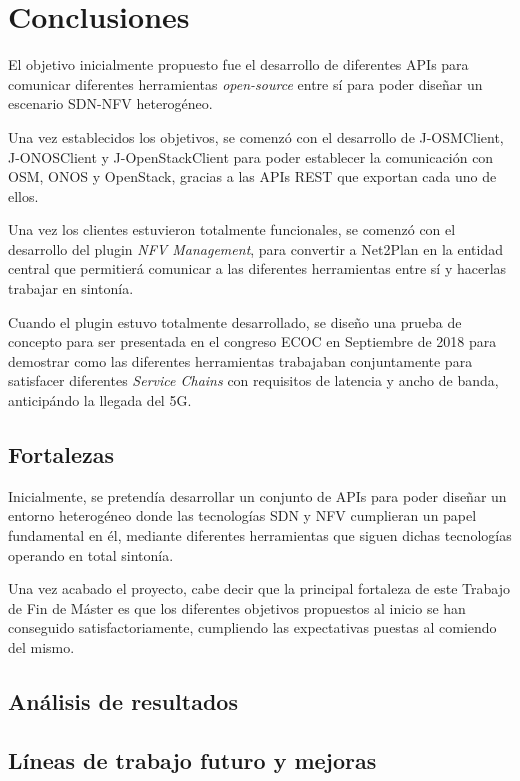 \chapter{Conclusiones}
\label{conclusiones}

El objetivo inicialmente propuesto fue el desarrollo de diferentes \acp{API} para comunicar diferentes herramientas \textit{open-source} entre sí para poder diseñar un escenario \ac{SDN}-\ac{NFV} heterogéneo.

Una vez establecidos los objetivos, se comenzó con el desarrollo de J-OSMClient, J-ONOSClient y J-OpenStackClient para poder establecer la comunicación con \ac{OSM}, \ac{ONOS} y OpenStack, gracias a las \acp{API} \ac{REST} que exportan cada uno de ellos.

Una vez los clientes estuvieron totalmente funcionales, se comenzó con el desarrollo del plugin \textit{NFV Management}, para convertir a Net2Plan en la entidad central que permitierá comunicar a las diferentes herramientas entre sí y hacerlas trabajar en sintonía.

Cuando el plugin estuvo totalmente desarrollado, se diseño una prueba de concepto para ser presentada en el congreso \ac{ECOC} en Septiembre de 2018 para demostrar como las diferentes herramientas trabajaban conjuntamente para satisfacer diferentes \textit{Service Chains} con requisitos de latencia y ancho de banda, anticipándo la llegada del 5G.


\section{Fortalezas}

Inicialmente, se pretendía desarrollar un conjunto de \acp{API} para poder diseñar un entorno heterogéneo donde las tecnologías \ac{SDN} y \ac{NFV} cumplieran un papel fundamental en él, mediante diferentes herramientas que siguen dichas tecnologías operando en total sintonía.

Una vez acabado el proyecto, cabe decir que la principal fortaleza de este Trabajo de Fin de Máster es que los diferentes objetivos propuestos al inicio se han conseguido satisfactoriamente, cumpliendo las expectativas puestas al comiendo del mismo.

\section{Análisis de resultados}

\section{Líneas de trabajo futuro y mejoras}

